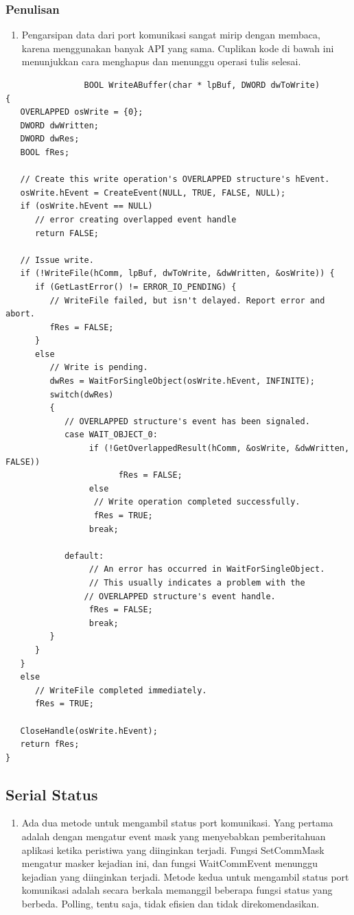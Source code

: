 			\subsubsection{Penulisan}
				\begin{enumerate}
					\item Pengarsipan data dari port komunikasi sangat mirip dengan membaca, karena menggunakan banyak API yang sama. Cuplikan kode di bawah ini menunjukkan cara menghapus dan menunggu operasi tulis selesai.
				\end{enumerate}
				\begin{verbatim}
				BOOL WriteABuffer(char * lpBuf, DWORD dwToWrite)
{
   OVERLAPPED osWrite = {0};
   DWORD dwWritten;
   DWORD dwRes;
   BOOL fRes;

   // Create this write operation's OVERLAPPED structure's hEvent.
   osWrite.hEvent = CreateEvent(NULL, TRUE, FALSE, NULL);
   if (osWrite.hEvent == NULL)
      // error creating overlapped event handle
      return FALSE;

   // Issue write.
   if (!WriteFile(hComm, lpBuf, dwToWrite, &dwWritten, &osWrite)) {
      if (GetLastError() != ERROR_IO_PENDING) { 
         // WriteFile failed, but isn't delayed. Report error and abort.
         fRes = FALSE;
      }
      else
         // Write is pending.
         dwRes = WaitForSingleObject(osWrite.hEvent, INFINITE);
         switch(dwRes)
         {
            // OVERLAPPED structure's event has been signaled. 
            case WAIT_OBJECT_0:
                 if (!GetOverlappedResult(hComm, &osWrite, &dwWritten, FALSE))
                       fRes = FALSE;
                 else
                  // Write operation completed successfully.
                  fRes = TRUE;
                 break;
            
            default:
                 // An error has occurred in WaitForSingleObject.
                 // This usually indicates a problem with the
                // OVERLAPPED structure's event handle.
                 fRes = FALSE;
                 break;
         }
      }
   }
   else
      // WriteFile completed immediately.
      fRes = TRUE;

   CloseHandle(osWrite.hEvent);
   return fRes;
}
\end{verbatim}	

	\subsection{Serial Status}
		\begin{enumerate}
			\item Ada dua metode untuk mengambil status port komunikasi. Yang pertama adalah dengan mengatur event mask yang menyebabkan pemberitahuan aplikasi ketika peristiwa yang diinginkan terjadi. Fungsi SetCommMask mengatur masker kejadian ini, dan fungsi WaitCommEvent menunggu kejadian yang diinginkan terjadi. Metode kedua untuk mengambil status port komunikasi adalah secara berkala memanggil beberapa fungsi status yang berbeda. Polling, tentu saja, tidak efisien dan tidak direkomendasikan.
		\end{enumerate}
